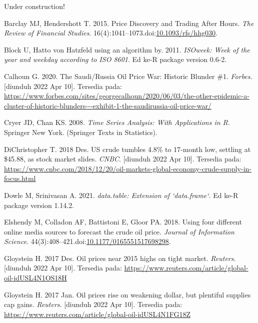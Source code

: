 \documentclass[
]{book}
\newlength{\cslhangindent}
\newlength{\cslentryspacingunit} %
\newenvironment{CSLReferences}[2] %
 {%
  \setlength{\parindent}{0pt}
  \ifodd #1
  \let\oldpar\par
  \def\par{\hangindent=\cslhangindent\oldpar}
  \fi
  \setlength{\parskip}{#2\cslentryspacingunit}
 }%
 {}
\begin{document}
Under construction!

\hypertarget{refs}{}
\begin{CSLReferences}{0}{0}
\leavevmode{}%
Barclay MJ, Hendershott T. 2015. Price {Discovery} and {Trading} {After} {Hours}. \emph{The Review of Financial Studies}. 16(4):1041--1073.doi:\href{https://doi.org/10.1093/rfs/hhg030}{10.1093/rfs/hhg030}.

\leavevmode{}%
Block U, Hatto von Hatzfeld using an algorithm by. 2011. \emph{ISOweek: Week of the year and weekday according to ISO 8601}. Ed ke-R package version 0.6-2.

\leavevmode{}%
Calhoun G. 2020. The {Saudi}/{Russia} {Oil} {Price} {War}: {Historic} {Blunder} \#1. \emph{Forbes}. {[}diunduh 2022 Apr 10{]}. Tersedia pada: \url{https://www.forbes.com/sites/georgecalhoun/2020/06/03/the-other-epidemic-a-cluster-of-historic-blunders---exhibit-1-the-saudirussia-oil-price-war/}

\leavevmode{}%
Cryer JD, Chan KS. 2008. \emph{Time {Series} {Analysis}: {With} {Applications} in {R}}. Springer New York. (Springer {Texts} in {Statistics}).

\leavevmode{}%
DiChristopher T. 2018 Des. {US} crude tumbles 4.8\% to 17-month low, settling at \$45.88, as stock market slides. \emph{CNBC}. {[}diunduh 2022 Apr 10{]}. Tersedia pada: \url{https://www.cnbc.com/2018/12/20/oil-markets-global-economy-crude-supply-in-focus.html}

\leavevmode{}%
Dowle M, Srinivasan A. 2021. \emph{data.table: Extension of `data.frame`}. Ed ke-R package version 1.14.2.

\leavevmode{}%
Elshendy M, Colladon AF, Battistoni E, Gloor PA. 2018. Using four different online media sources to forecast the crude oil price. \emph{Journal of Information Science}. 44(3):408--421.doi:\href{https://doi.org/10.1177/0165551517698298}{10.1177/0165551517698298}.

\leavevmode{}%
Gloystein H. 2017 Des. Oil prices near 2015 highs on tight market. \emph{Reuters}. {[}diunduh 2022 Apr 10{]}. Tersedia pada: \url{https://www.reuters.com/article/global-oil-idUSL4N1OS18H}

\leavevmode{}%
Gloystein H. 2017 Jan. Oil prices rise on weakening dollar, but plentiful supplies cap gains. \emph{Reuters}. {[}diunduh 2022 Apr 10{]}. Tersedia pada: \url{https://www.reuters.com/article/global-oil-idUSL4N1FG18Z}


\end{CSLReferences}
\end{document}
